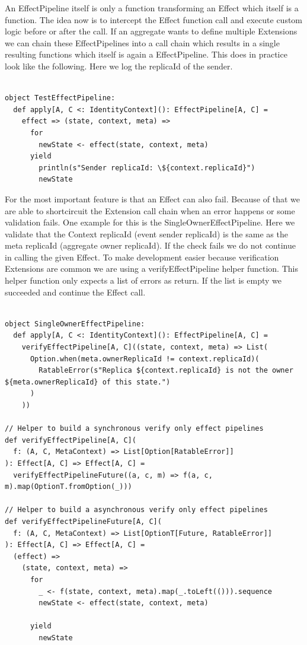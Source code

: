 \documentclass[
	ngerman,
	ruledheaders=section,   %
	class=report,		    %
	thesis={type=bachelor}, %
	accentcolor=9c,			%
	custommargins=true,    %
	marginpar=false,        %
	parskip=half-,          %
	fontsize=11pt,          %
]{tudapub}
\begin{document}
An EffectPipeline itself is only a function transforming an Effect which itself is a function. The idea now is to intercept the Effect function call and execute custom logic before or after the call. If an aggregate wants to define multiple Extensions we can chain these EffectPipelines into a call chain which results in a single resulting functions which itself is again a EffectPipeline. This does in practice look like the following. Here we log the replicaId of the sender.

\begin{lstlisting}

object TestEffectPipeline:
  def apply[A, C <: IdentityContext](): EffectPipeline[A, C] =
    effect => (state, context, meta) => 
      for
        newState <- effect(state, context, meta)
      yield
        println(s"Sender replicaId: \${context.replicaId}")
        newState

\end{lstlisting}

For the most important feature is that an Effect can also fail. Because of that we are able to shortcircuit the Extension call chain when an error happens or some validation fails. One example for this is the SingleOwnerEffectPipeline. Here we validate that the Context replicaId (event sender replicaId) is the same as the meta replicaId (aggregate owner replicaId). If the check fails we do not continue in calling the given Effect. To make development easier because verification Extensions are common we are using a verifyEffectPipeline helper function. This helper function only expects a list of errors as return. If the list is empty we succeeded and continue the Effect call.

\begin{lstlisting}
  
object SingleOwnerEffectPipeline:
  def apply[A, C <: IdentityContext](): EffectPipeline[A, C] =
    verifyEffectPipeline[A, C]((state, context, meta) => List(
      Option.when(meta.ownerReplicaId != context.replicaId)(
        RatableError(s"Replica ${context.replicaId} is not the owner ${meta.ownerReplicaId} of this state.")
      )
    ))

// Helper to build a synchronous verify only effect pipelines
def verifyEffectPipeline[A, C](
  f: (A, C, MetaContext) => List[Option[RatableError]]
): Effect[A, C] => Effect[A, C] =
  verifyEffectPipelineFuture((a, c, m) => f(a, c, m).map(OptionT.fromOption(_)))
  
// Helper to build a asynchronous verify only effect pipelines
def verifyEffectPipelineFuture[A, C](
  f: (A, C, MetaContext) => List[OptionT[Future, RatableError]]
): Effect[A, C] => Effect[A, C] =
  (effect) =>
    (state, context, meta) => 
      for
        _ <- f(state, context, meta).map(_.toLeft(())).sequence
        newState <- effect(state, context, meta)

      yield
        newState

\end{lstlisting}
\end{document}

